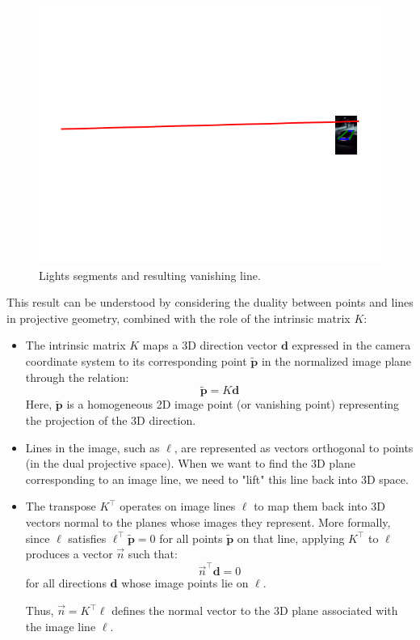 \begin{figure}
    \centering
    \includegraphics[width=0.75\linewidth]{Images/vanishing_line_method2.png}
    \caption{Lights segments and resulting vanishing line.}
    \label{fig:vanLine1}
\end{figure}

This result can be understood by considering the duality between points and lines in projective geometry, combined with the role of the intrinsic matrix \( K \):

\begin{itemize}
    \item The intrinsic matrix \( K \) maps a 3D direction vector \( \mathbf{d} \) expressed in the camera coordinate system to its corresponding point \( \tilde{\mathbf{p}} \) in the normalized image plane through the relation:
    \[
    \tilde{\mathbf{p}} = K \mathbf{d}
    \]
    Here, \( \tilde{\mathbf{p}} \) is a homogeneous 2D image point (or vanishing point) representing the projection of the 3D direction.

    \item Lines in the image, such as \( \ell \), are represented as vectors orthogonal to points (in the dual projective space). When we want to find the 3D plane corresponding to an image line, we need to "lift" this line back into 3D space.

    \item The transpose \( K^\top \) operates on image lines \( \ell \) to map them back into 3D vectors normal to the planes whose images they represent. More formally, since \( \ell \) satisfies \( \ell^\top \tilde{\mathbf{p}} = 0 \) for all points \( \tilde{\mathbf{p}} \) on that line, applying \( K^\top \) to \( \ell \) produces a vector \( \vec{n} \) such that:
    \[
    \vec{n}^\top \mathbf{d} = 0
    \]
    for all directions \( \mathbf{d} \) whose image points lie on \( \ell \).

    Thus, \( \vec{n} = K^\top \ell \) defines the normal vector to the 3D plane associated with the image line \( \ell \).
\end{itemize}


